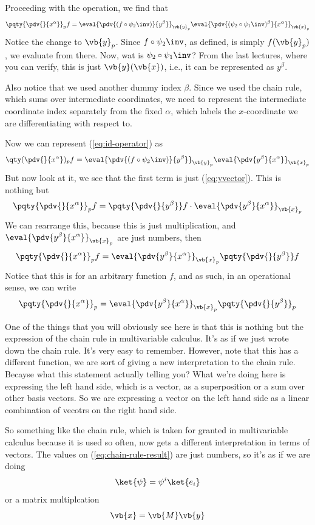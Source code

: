 Proceeding with the operation, we find that
\[
	\pqty{ \pdv{}{x^\alpha}}_p f 
	=
	\eval{\pdv{(f\circ\psi_2\inv)}{y^\beta}}_{\vb{y}_p} \eval{\pdv{(\psi_2\circ\psi_1\inv)^\beta}{x^\alpha}}_{\vb{x}_p} 
	\label{eq:id-operator}
\]
Notice the change to $\vb{y}_p$. Since $f\circ \psi_2\inv$, as defined, is simply $f(\vb{y}_p)$, we evaluate from there.
Now, wat is $\psi_2\circ\psi_1\inv$? From the last lectures, where you can verify, this is just $\vb{y}(\vb{x})$, i.e., it
can be represented as $y^\beta$.

Also notice that we used another dummy index $\beta$. Since we used the chain rule, which sums over intermediate coordinates,
we need to represent the intermediate coordinate index separately from the fixed 
$\alpha$, which labels the $x$-coordinate we are differentiating with respect to.

Now we can represent (\ref{eq:id-operator}) as 
\[
	\qty( \pdv{}{x^\alpha})_p f 
	=
	\eval{\pdv{(f\circ\psi_2\inv)}{y^\beta}}_{\vb{y}_p} 
	\eval{\pdv{y^\beta}{x^\alpha}}_{\vb{x}_p} 
\]
But now look at it, we see that the first term is just (\ref{eq:yvector}). This is nothing but
\[
	\pqty{ \pdv{}{x^\alpha}}_p f 
	=
	\pqty{\pdv{}{y^\beta}}f \cdot 
	\eval{\pdv{y^\beta}{x^\alpha}}_{\vb{x}_p} 
\]
We can rearrange this, because this is just multiplication, and $\displaystyle\eval{\pdv{y^\beta}{x^\alpha}}_{\vb{x}_p}$ are just numbers, then
\[
	\pqty{ \pdv{}{x^\alpha}}_p f 
	=
	\eval{\pdv{y^\beta}{x^\alpha}}_{\vb{x}_p} 
	\pqty{\pdv{}{y^\beta}}f  
\]
Notice that this is for an arbitrary function $f$, and as such, in an operational sense, we can write
\[
	\pqty{ \pdv{}{x^\alpha}}_p 
	=
	\eval{\pdv{y^\beta}{x^\alpha}}_{\vb{x}_p} 
	\pqty{{\pdv{}{y^\beta}}}_p
	\label{eq:chain-rule-result}
\]

One of the things that you will obviously see here is that this is nothing but the expression 
of the chain rule in multivariable calculus. It's as if we just wrote down the chain rule. It's very 
easy to remember. However, note that this has a different function, we are sort of giving a new interpretation
to the chain rule. Becayse what this statement actually telling you? 
What we're doing here is expressing the left hand side, which is a vector, as a superposition or a sum over other 
basis vectors. So we are expressing a vector on the left hand side as a linear combination of vecotrs on the right hand side. 

So something like the chain rule, which is taken for granted in multivariable calculus because it is used so 
often, now gets a different interpretation in terms of vectors. The values on (\ref{eq:chain-rule-result})  are 
just numbers, so it's as if we are doing
\[
	\ket{\psi} = \psi^i \ket{e_i}
\]
or a matrix multiplcation 
\[
	\vb{x} = \vb{M}\vb{y}
\]

